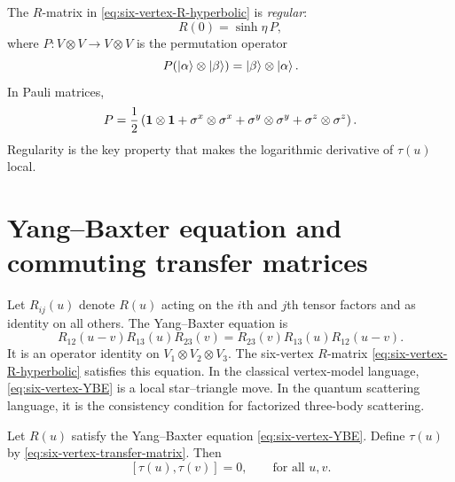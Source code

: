 The $R$-matrix in \cref{eq:six-vertex-R-hyperbolic} is \emph{regular}:
\begin{equation}
\label{eq:six-vertex-regularity}
    R(0)=\sinh\eta\,P,
\end{equation}
where $P:V\otimes V\to V\otimes V$ is the permutation operator
\begin{equation}
\label{eq:permutation-operator-definition}
    P(\left|\alpha\right\rangle\otimes\left|\beta\right\rangle)
    =
    \left|\beta\right\rangle\otimes\left|\alpha\right\rangle .
\end{equation}
In Pauli matrices,
\begin{equation}
\label{eq:permutation-operator-pauli}
    P=\frac12\left(
        \mathbf{1}\otimes\mathbf{1}
        +\sigma^x\otimes\sigma^x
        +\sigma^y\otimes\sigma^y
        +\sigma^z\otimes\sigma^z
    \right).
\end{equation}
Regularity is the key property that makes the logarithmic derivative of
$\tau(u)$ local.

\section{Yang--Baxter equation and commuting transfer matrices}
\label{sec:six-vertex-yang-baxter}

Let $R_{ij}(u)$ denote $R(u)$ acting on the $i$th and $j$th tensor factors and as
identity on all others.  The Yang--Baxter equation is
\begin{equation}
\label{eq:six-vertex-YBE}
    R_{12}(u-v)R_{13}(u)R_{23}(v)
    =
    R_{23}(v)R_{13}(u)R_{12}(u-v) .
\end{equation}
It is an operator identity on $V_1\otimes V_2\otimes V_3$.  The six-vertex
$R$-matrix \cref{eq:six-vertex-R-hyperbolic} satisfies this equation.  In the
classical vertex-model language, \cref{eq:six-vertex-YBE} is a local
star--triangle move.  In the quantum scattering language, it is the consistency
condition for factorized three-body scattering.

\begin{theorem}
\label{thm:six-vertex-commuting-transfer}
Let $R(u)$ satisfy the Yang--Baxter equation \cref{eq:six-vertex-YBE}.  Define
$\tau(u)$ by \cref{eq:six-vertex-transfer-matrix}.  Then
\begin{equation}
\label{eq:six-vertex-transfer-commutativity}
    [\tau(u),\tau(v)]=0,
    \qquad
    \text{for all }u,v .
\end{equation}
\end{theorem}

